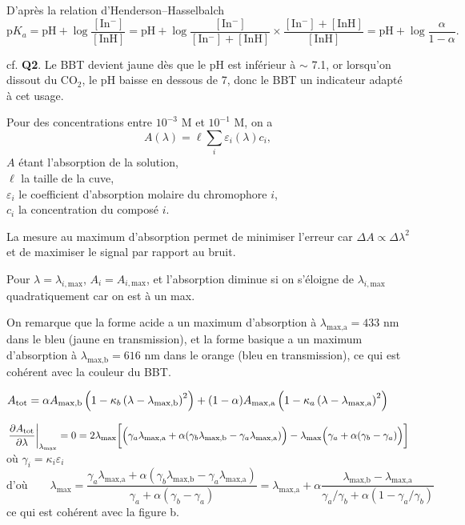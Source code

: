 \begin{solution}
\begin{questions}
    \question D'après la relation d'Henderson--Hasselbalch
    $$\text{p}K_a = \text{pH} + \log\mathrm{\dfrac{[In^-]}{[InH]}}
    = \text{pH} + \log\mathrm{\dfrac{[In^-]}{[In^-] + [InH]} \times \dfrac{[In^-] + [InH]}{[InH]}} = \text{pH} + \log\dfrac{\alpha}{1 - \alpha}.$$
    
    \question cf. \textbf{\sffamily Q2}. Le BBT devient jaune dès que le pH est inférieur à $\sim$ 7.1, or lorsqu'on dissout du CO$_2$, le pH baisse en dessous de 7, donc le BBT un indicateur adapté à cet usage.
    
    \question Pour des concentrations entre $10^{-3}$ M et $10^{-1}$ M, on a
    $$A(\lambda) = \ell\sum_i \varepsilon_i(\lambda) c_i,$$
    $A$ étant l'absorption de la solution, \\
    $\ell$ la taille de la cuve, \\
    $\varepsilon_i$ le coefficient d'absorption molaire du chromophore $i$, \\
    $c_i$ la concentration du composé $i$.
    
    \question La mesure au maximum d'absorption permet de minimiser l'erreur car $\Delta A \propto \Delta\lambda^2$ et de maximiser le signal par rapport au bruit.
    
    Pour $\lambda = \lambda_{i,\text{max}}$, $A_i = A_{i,\text{max}}$, et l'absorption diminue si on s'éloigne de $\lambda_{i,\text{max}}$ quadratiquement car on est à un max. 
    
    \question On remarque que la forme acide a un maximum d'absorption à $\lambda_\text{max,a} = 433$ nm dans le bleu (jaune en transmission), et la forme basique a un maximum d'absorption à $\lambda_\text{max,b} = 616$ nm dans le orange (bleu en transmission), ce qui est cohérent avec la couleur du BBT.
    
    \question $A_\text{tot} = \alpha A_{\text{max,b}}\,\qty(1 - \kappa_b\,\qty(\lambda - \lambda_{\text{max,b}})^2) + (1-\alpha) A_{\text{max,a}}\,\qty(1 - \kappa_a\,\qty(\lambda - \lambda_{\text{max,a}})^2)$
    
    \question $\displaystyle\eval{\pdv{A_\text{tot}}{\lambda}}_{\lambda_\text{max}} = 0 = 
    2\lambda_\text{max}\qty\bigg[\qty\Big(\gamma_a \lambda_\text{max,a} + \alpha (\gamma_b \lambda_\text{max,b} - \gamma_a \lambda_\text{max,a})) - \lambda_\text{max} \qty\Big(\gamma_a + \alpha(\gamma_b - \gamma_a))]$
    où  $\gamma_i = \kappa_i \varepsilon_i$
    $$\text{d'où}\qquad \lambda_\text{max} = \dfrac{\gamma_a \lambda_\text{max,a} + \alpha (\gamma_b \lambda_\text{max,b} - \gamma_a \lambda_\text{max,a})}{\gamma_a + \alpha(\gamma_b - \gamma_a)}
        = \lambda_\text{max,a} + \alpha \dfrac{\lambda_\text{max,b} - \lambda_\text{max,a}}{\gamma_a/\gamma_b + \alpha(1 - \gamma_a/\gamma_b)}$$
    ce qui est cohérent avec la figure b.
\end{questions}
\end{solution}